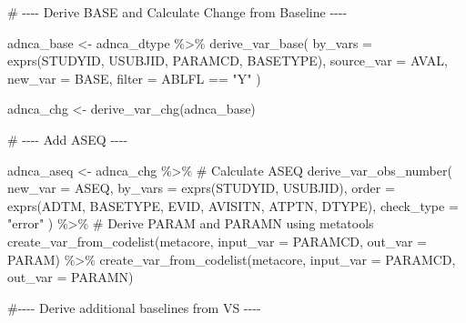 \documentclass[
  letterpaper,
  DIV=11,
  numbers=noendperiod]{scrreprt}
\newenvironment{Shaded}{\begin{snugshade}}{\end{snugshade}}
\newcommand{\AttributeTok}[1]{\textcolor[rgb]{0.40,0.45,0.13}{#1}}
\newcommand{\CommentTok}[1]{\textcolor[rgb]{0.37,0.37,0.37}{#1}}
\newcommand{\FunctionTok}[1]{\textcolor[rgb]{0.28,0.35,0.67}{#1}}
\newcommand{\NormalTok}[1]{\textcolor[rgb]{0.00,0.23,0.31}{#1}}
\newcommand{\OtherTok}[1]{\textcolor[rgb]{0.00,0.23,0.31}{#1}}
\newcommand{\SpecialCharTok}[1]{\textcolor[rgb]{0.37,0.37,0.37}{#1}}
\newcommand{\StringTok}[1]{\textcolor[rgb]{0.13,0.47,0.30}{#1}}
\begin{document}
\begin{Shaded}
\begin{Highlighting}[]
\CommentTok{\# {-}{-}{-}{-} Derive BASE and Calculate Change from Baseline {-}{-}{-}{-}}

\NormalTok{adnca\_base }\OtherTok{\textless{}{-}}\NormalTok{ adnca\_dtype }\SpecialCharTok{\%\textgreater{}\%}
  \FunctionTok{derive\_var\_base}\NormalTok{(}
    \AttributeTok{by\_vars =} \FunctionTok{exprs}\NormalTok{(STUDYID, USUBJID, PARAMCD, BASETYPE),}
    \AttributeTok{source\_var =}\NormalTok{ AVAL,}
    \AttributeTok{new\_var =}\NormalTok{ BASE,}
    \AttributeTok{filter =}\NormalTok{ ABLFL }\SpecialCharTok{==} \StringTok{"Y"}
\NormalTok{  )}

\NormalTok{adnca\_chg }\OtherTok{\textless{}{-}} \FunctionTok{derive\_var\_chg}\NormalTok{(adnca\_base)}

\CommentTok{\# {-}{-}{-}{-} Add ASEQ {-}{-}{-}{-}}

\NormalTok{adnca\_aseq }\OtherTok{\textless{}{-}}\NormalTok{ adnca\_chg }\SpecialCharTok{\%\textgreater{}\%}
  \CommentTok{\# Calculate ASEQ}
  \FunctionTok{derive\_var\_obs\_number}\NormalTok{(}
    \AttributeTok{new\_var =}\NormalTok{ ASEQ,}
    \AttributeTok{by\_vars =} \FunctionTok{exprs}\NormalTok{(STUDYID, USUBJID),}
    \AttributeTok{order =} \FunctionTok{exprs}\NormalTok{(ADTM, BASETYPE, EVID, AVISITN, ATPTN, DTYPE),}
    \AttributeTok{check\_type =} \StringTok{"error"}
\NormalTok{  ) }\SpecialCharTok{\%\textgreater{}\%}
  \CommentTok{\# Derive PARAM and PARAMN using metatools}
  \FunctionTok{create\_var\_from\_codelist}\NormalTok{(metacore, }\AttributeTok{input\_var =}\NormalTok{ PARAMCD, }\AttributeTok{out\_var =}\NormalTok{ PARAM) }\SpecialCharTok{\%\textgreater{}\%}
  \FunctionTok{create\_var\_from\_codelist}\NormalTok{(metacore, }\AttributeTok{input\_var =}\NormalTok{ PARAMCD, }\AttributeTok{out\_var =}\NormalTok{ PARAMN)}

\CommentTok{\#{-}{-}{-}{-} Derive additional baselines from VS {-}{-}{-}{-}}


\end{Highlighting}
\end{Shaded}
\end{document}
